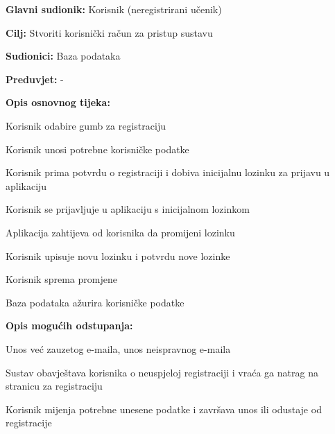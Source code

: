 					\noindent {}
					\begin{packed_item}
	
						\item \textbf{Glavni sudionik: }Korisnik (neregistrirani učenik)
						\item  \textbf{Cilj:} Stvoriti korisnički račun za pristup sustavu
						\item  \textbf{Sudionici:} Baza podataka
						\item  \textbf{Preduvjet:} -
						\item  \textbf{Opis osnovnog tijeka:}
						
						\item[] \begin{packed_enum}
	
							\item Korisnik odabire gumb za registraciju
							\item Korisnik unosi potrebne korisničke podatke
							\item Korisnik prima potvrdu o registraciji i dobiva inicijalnu lozinku za prijavu u aplikaciju
							\item Korisnik se prijavljuje u aplikaciju s inicijalnom lozinkom
							\item Aplikacija zahtijeva od korisnika da promijeni lozinku
							\item Korisnik upisuje novu lozinku i potvrdu nove lozinke
							\item Korisnik sprema promjene
							\item Baza podataka ažurira korisničke podatke
						\end{packed_enum}
						
						\item  \textbf{Opis mogućih odstupanja:}
						
						\item[] \begin{packed_item}
	
							\item[2.a] Unos već zauzetog e-maila, unos neispravnog e-maila
							\item[] \begin{packed_enum}
								
								\item Sustav obavještava korisnika o neuspjeloj registraciji i vraća ga natrag na stranicu za registraciju
								\item Korisnik mijenja potrebne unesene podatke i završava unos ili odustaje od registracije
								

\end{packed_enum}
\end{packed_item}
\end{packed_item}

